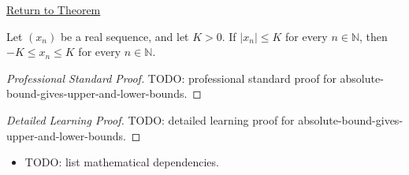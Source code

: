 \newpage
{}
\label{prf:absolute-bound-upper-lower-bounds}

\begin{remark*}[Return]
\hyperref[thm:absolute-bound-upper-lower-bounds]{Return to Theorem}
\end{remark*}

\begin{theorem*}
Let $(x_n)$ be a real sequence, and let $K > 0$. If $|x_n| \le K$ for every
$n \in \mathbb{N}$, then $-K \le x_n \le K$ for every
$n \in \mathbb{N}$.

\smallskip
\noindent
\end{theorem*}

\begin{proof}[Professional Standard Proof]
\LRAProofBodyStart
TODO: professional standard proof for absolute-bound-gives-upper-and-lower-bounds.
\end{proof}

\begin{proof}[Detailed Learning Proof]
\LRAProofBodyStart
TODO: detailed learning proof for absolute-bound-gives-upper-and-lower-bounds.
\end{proof}

\begin{remark*}
\end{remark*}

\begin{dependencies}
\begin{itemize}
  \item TODO: list mathematical dependencies.
\end{itemize}
\end{dependencies}

\clearpage
